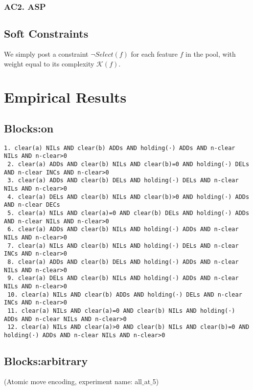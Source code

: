 \documentclass[a4paper]{article}
\begin{document}
\subsubsection{AC2. ASP}


\subsection{Soft Constraints}
We simply post a constraint $\neg Select(f)$ for each feature $f$ in the pool, with weight equal to its complexity $\mathcal{K}(f)$.

\section{Empirical Results}



\subsection{Blocks:on}
\begin{Verbatim}[fontsize=\footnotesize]
 1. clear(a) NILs AND clear(b) ADDs AND holding(·) ADDs AND n-clear NILs AND n-clear>0
 2. clear(a) ADDs AND clear(b) NILs AND clear(b)=0 AND holding(·) DELs AND n-clear INCs AND n-clear>0
 3. clear(a) ADDs AND clear(b) DELs AND holding(·) DELs AND n-clear NILs AND n-clear>0
 4. clear(a) DELs AND clear(b) NILs AND clear(b)>0 AND holding(·) ADDs AND n-clear DECs
 5. clear(a) NILs AND clear(a)=0 AND clear(b) DELs AND holding(·) ADDs AND n-clear NILs AND n-clear>0
 6. clear(a) ADDs AND clear(b) NILs AND holding(·) ADDs AND n-clear NILs AND n-clear>0
 7. clear(a) NILs AND clear(b) NILs AND holding(·) DELs AND n-clear INCs AND n-clear>0
 8. clear(a) ADDs AND clear(b) DELs AND holding(·) ADDs AND n-clear NILs AND n-clear>0
 9. clear(a) DELs AND clear(b) NILs AND holding(·) ADDs AND n-clear NILs AND n-clear>0
 10. clear(a) NILs AND clear(b) ADDs AND holding(·) DELs AND n-clear INCs AND n-clear>0
 11. clear(a) NILs AND clear(a)=0 AND clear(b) NILs AND holding(·) ADDs AND n-clear NILs AND n-clear>0
 12. clear(a) NILs AND clear(a)>0 AND clear(b) NILs AND clear(b)=0 AND holding(·) ADDs AND n-clear NILs AND n-clear>0
\end{Verbatim}

\subsection{Blocks:arbitrary}
(Atomic move encoding, experiment name: all$\_$at$\_$5)
\end{document}

